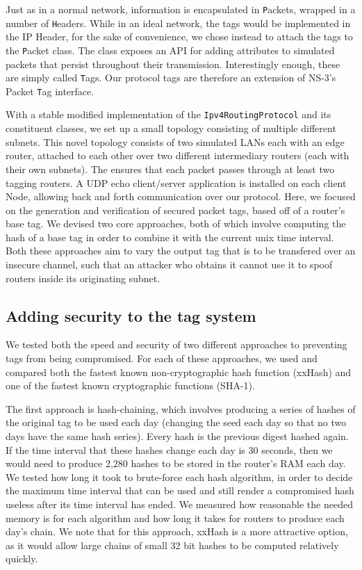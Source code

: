 \documentclass[12pt]{article} %
\newcommand{\prettycode}[1]
{\lstinline[basicstyle=\ttfamily]{#1}}
\begin{document}
Just as in a normal network, information is encapsulated in {\prettycode Packets}, wrapped in a number of {\prettycode Headers}. While in an ideal network, the tags would be implemented in the IP Header, for the sake of convenience, we chose instead to attach the tags to the {\prettycode Packet} class. The class exposes an API for adding attributes to simulated packets that persist throughout their transmission. Interestingly enough, these are simply called {\prettycode Tags}. Our protocol tags are therefore an extension of NS-3's Packet {\prettycode Tag} interface.

With a stable modified implementation of the \prettycode{Ipv4RoutingProtocol} and its constituent classes, we set up a small topology consisting of multiple different subnets. This novel topology consists of two simulated LANs each with an edge router, attached to each other over two different intermediary routers (each with their own subnets). The ensures that each packet passes through at least two tagging routers. A UDP echo client/server application is installed on each client Node, allowing back and forth communication over our protocol. Here, we focused on the generation and verification of secured packet tags, based off of a router's base tag. We devised two core approaches, both of which involve computing the hash of a base tag in order to combine it with the current unix time interval. Both these approaches aim to vary the output tag that is to be transfered over an insecure channel, such that an attacker who obtains it cannot use it to spoof routers inside its originating subnet.

\subsection{Adding security to the tag system}

We tested both the speed and security of two different approaches to preventing tags from being compromised. For each of these approaches, we used and compared both the fastest known non-cryptographic hash function (xxHash\cite{xxhash}) and one of the fastest known cryptographic functions (SHA-1). 

The first approach is hash-chaining, which involves producing a series of hashes of the original tag to be used each day (changing the seed each day so that no two days have the same hash series). Every hash is the previous digest hashed again. If the time interval that these hashes change each day is 30 seconds, then we would need to produce 2,280 hashes to be stored in the router's RAM each day. We tested how long it took to brute-force each hash algorithm, in order to decide the maximum time interval that can be used and still render a compromised hash useless after its time interval has ended. We measured how reasonable the needed memory is for each algorithm and how long it takes for routers to produce each day's chain. We note that for this approach, xxHash is a more attractive option, as it would allow large chains of small 32 bit hashes to be computed relatively quickly.
\end{document}
